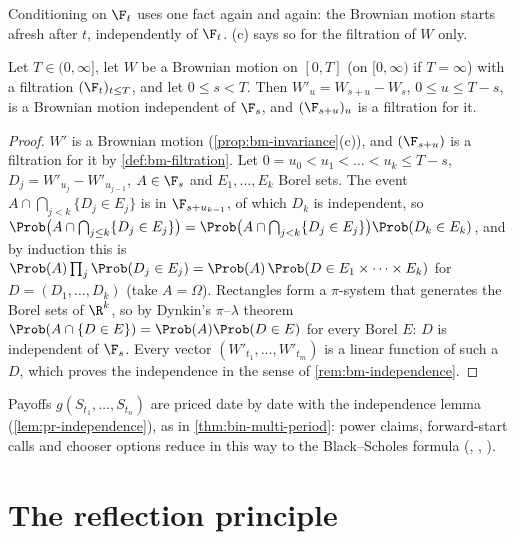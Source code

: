 Conditioning on $\F_t$ uses one fact again and again: the Brownian motion starts afresh after $t$,
independently of $\F_t$. (c) says so for the filtration of $W$ only.

\begin{lemma}\label{lem:exo-restart}
Let $T\in(0,\infty]$, let $W$ be a Brownian motion on $[0,T]$ (on $[0,\infty)$ if $T=\infty$)
with a filtration $(\F_t)_{t\le T}$, and let $0\le s<T$. Then $W'_u=W_{s+u}-W_s$,
$0\le u\le T-s$, is a Brownian motion independent of $\F_s$, and $(\F_{s+u})_u$ is a
filtration for it.
\end{lemma}

\begin{proof}
$W'$ is a Brownian motion (\cref{prop:bm-invariance}(c)), and $(\F_{s+u})$ is a filtration for it by
\cref{def:bm-filtration}. Let
$0=u_0<u_1<\dots<u_k\le T-s$, $D_j=W'_{u_j}-W'_{u_{j-1}}$, $A\in\F_s$ and $E_1,\dots,E_k$ Borel
sets. The event $A\cap\bigcap_{j<k}\{D_j\in E_j\}$ is in $\F_{s+u_{k-1}}$, of which $D_k$ is
independent, so
$\Prob\big(A\cap\bigcap_{j\le k}\{D_j\in E_j\}\big)=\Prob\big(A\cap\bigcap_{j<k}\{D_j\in E_j\}\big)\Prob(D_k\in E_k)$,
and by induction this is $\Prob(A)\prod_j\Prob(D_j\in E_j)=\Prob(A)\,\Prob(D\in E_1\times\dots\times E_k)$
for $D=(D_1,\dots,D_k)$ (take $A=\Omega$). Rectangles form a
$\pi$-system that generates the Borel sets of $\R^k$, so by Dynkin's $\pi$--$\lambda$ theorem
$\Prob(A\cap\{D\in E\})=\Prob(A)\Prob(D\in E)$ for every Borel $E$: $D$ is independent of $\F_s$.
Every vector $(W'_{t_1},\dots,W'_{t_m})$ is a linear function of such a $D$, which proves the
independence in the sense of \cref{rem:bm-independence}.
\end{proof}

\begin{remark}\label{rem:exo-dates}
Payoffs $g(S_{t_1},\dots,S_{t_n})$ are priced date by date with the independence lemma
(\cref{lem:pr-independence}), as in \cref{thm:bin-multi-period}: power claims, forward-start calls
and chooser options reduce in this way to the Black--Scholes formula (,
, ).
\end{remark}

\section{The reflection principle}\label{sec:exo-reflection}

